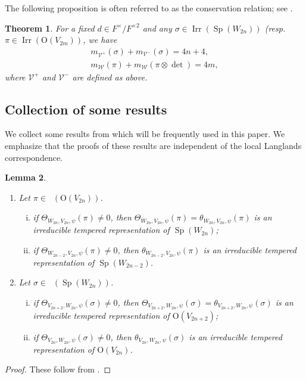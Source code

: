 \documentclass[article]{article}
\numberwithin{equation}{section}
\newtheorem{theorem}{Theorem}[section]
\newtheorem{lemma}[theorem]{Lemma}
\theoremstyle{definition}
\DeclareMathOperator{\SP}{Sp}
\DeclareMathOperator{\Irr}{Irr}
\DeclareMathOperator{\Irrt}{Irr_{temp}}
\begin{document}
The following proposition is often referred to as the conservation relation; see \cite{MR3369906}. 
\begin{theorem}\label{con2}
	For a fixed $d\in F^\times /F^{\times 2}$ and any $\sigma\in \Irr(\SP(W_{2n}))$ (resp. $\pi\in \Irr(\mathrm O(V_{2m}))$, we have 
	\begin{align*}
	m_{\mathcal V^+}(\sigma)+m_{\mathcal V^-}(\sigma)=4n+4 ,\\
	m_{\mathcal W}(\pi)+m_{\mathcal W}(\pi\otimes \det)=4m, 
	\end{align*}
	where $\mathcal V^+$ and $\mathcal V^-$ are defined as above. 
\end{theorem}


\subsection{Collection of some results}
We collect some results from \cite{MR3166215} which will be frequently used in this paper. We emphasize that the proofs of these results are independent of the local Langlands correspondence. 



\begin{lemma}\label{temperedtotempered}
\begin{enumerate}
	\item Let $\pi\in \Irrt \left(\mathrm  O(V_{2n})\right)$.
	\begin{enumerate}[(i)]
		\item if $\Theta_{W_{2n}, V_{2n},\psi}(\pi)\neq 0$, then $\Theta_{W_{2n}, V_{2n},\psi}(\pi)=\theta_{W_{2n}, V_{2n},\psi}(\pi)$ is an irreducible tempered representation of $\SP(W_{2n})$; 
		\item if $\Theta_{W_{2n-2}, V_{2n},\psi}(\pi)\neq 0$, then $\theta_{W_{2n-2}, V_{2n},\psi}(\pi)$ is an irreducible tempered representation of $\SP(W_{2n-2})$.
	\end{enumerate}
\item Let $\sigma\in \Irrt \left(\SP(W_{2n})\right)$. 
\begin{enumerate}[(i)]
	\item if $\Theta_{V_{2n+2},W_{2n}, \psi}(\sigma)\neq 0$, then $\Theta_{V_{2n+2},W_{2n}, \psi}(\sigma)=\theta_{V_{2n+2},W_{2n}, \psi}(\sigma)$ is an irreducible tempered representation of $\mathrm O(V_{2n+2})$; 
	\item if $\Theta_{V_{2n},W_{2n}, \psi}(\sigma)\neq 0$, then $\theta_{V_{2n},W_{2n}, \psi}(\sigma)$ is an irreducible tempered representation of $\mathrm O(V_{2n})$.
\end{enumerate}
\end{enumerate}

\end{lemma}
\begin{proof}
	These follow from \cite[Proposition C.4]{MR3166215}. 
\end{proof}
\end{document}
